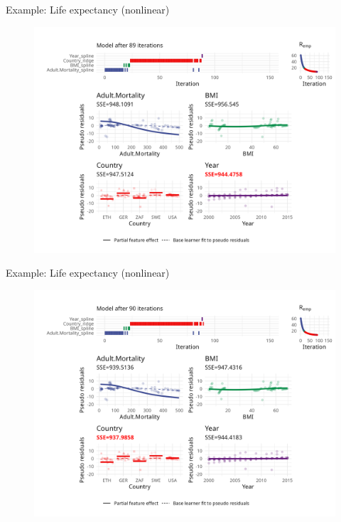 \begin{frame}{Example: Life expectancy (nonlinear)}
	\begin{figure}
		\centering
		\includegraphics[width=\textwidth]{figures/cwb-anim/fig-iter-0089.png}
	\end{figure}
	\addtocounter{framenumber}{-1}
\end{frame}


\begin{frame}{Example: Life expectancy (nonlinear)}
	\begin{figure}
		\centering
		\includegraphics[width=\textwidth]{figures/cwb-anim/fig-iter-0090.png}
	\end{figure}
	\addtocounter{framenumber}{-1}
\end{frame}



